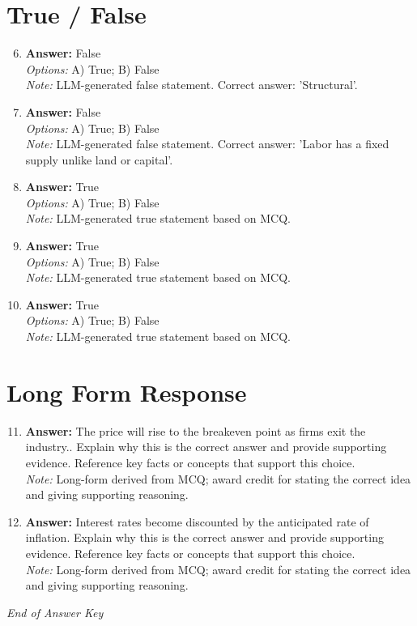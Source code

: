 \documentclass[12pt]{article}
\begin{document}
\section*{True / False}
\begin{enumerate}[label=\arabic*.]
\setcounter{enumi}{5}
\item \textbf{Answer:} False
\\ \textit{Options:} A) True; B) False
\\ \textit{Note:} LLM-generated false statement. Correct answer: 'Structural'.
\item \textbf{Answer:} False
\\ \textit{Options:} A) True; B) False
\\ \textit{Note:} LLM-generated false statement. Correct answer: 'Labor has a fixed supply unlike land or capital'.
\item \textbf{Answer:} True
\\ \textit{Options:} A) True; B) False
\\ \textit{Note:} LLM-generated true statement based on MCQ.
\item \textbf{Answer:} True
\\ \textit{Options:} A) True; B) False
\\ \textit{Note:} LLM-generated true statement based on MCQ.
\item \textbf{Answer:} True
\\ \textit{Options:} A) True; B) False
\\ \textit{Note:} LLM-generated true statement based on MCQ.
\end{enumerate}

\section*{Long Form Response}
\begin{enumerate}[label=\arabic*.]
\setcounter{enumi}{10}
\item \textbf{Answer:} The price will rise to the breakeven point as firms exit the industry.. Explain why this is the correct answer and provide supporting evidence. Reference key facts or concepts that support this choice.
\\ \textit{Note:} Long-form derived from MCQ; award credit for stating the correct idea and giving supporting reasoning.
\item \textbf{Answer:} Interest rates become discounted by the anticipated rate of inflation. Explain why this is the correct answer and provide supporting evidence. Reference key facts or concepts that support this choice.
\\ \textit{Note:} Long-form derived from MCQ; award credit for stating the correct idea and giving supporting reasoning.
\end{enumerate}

\vfill
\noindent\textit{End of Answer Key}
\end{document}
